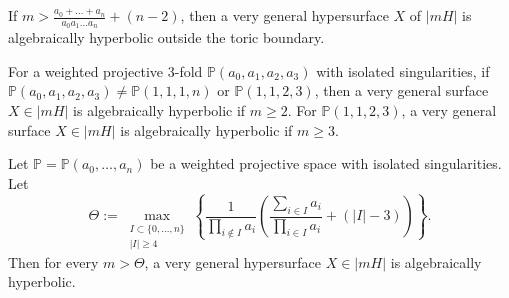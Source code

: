 \documentclass[10pt,a4paper]{amsart}
\begin{document}
\begin{proposition}\label{prop2}
 If $m > \frac{a_0 + \dots + a_n}{a_0a_1... a_n} + (n-2)$, then a very general hypersurface $X$ of $|mH|$ is algebraically hyperbolic outside the toric boundary.
\end{proposition}

\begin{proposition}\label{prop3}
For a weighted projective $3$-fold $\mathbb{P}(a_0,a_1,a_2,a_3)$ with isolated singularities, if $\mathbb{P}(a_0,a_1,a_2,a_3) \neq \mathbb{P}(1,1,1,n)$ or $\mathbb{P}(1,1,2,3)$, then a very general surface $X\in |mH|$ is algebraically hyperbolic if $m \geq 2$. For $\mathbb{P}(1,1,2,3)$, a very general surface $X\in|mH|$ is algebraically hyperbolic if $m\geq 3$.
\end{proposition}

\begin{proposition}\label{prop4}
  
Let $\mathbb{P} = \mathbb{P}(a_0,\dots,a_n)$ be a weighted projective space with isolated singularities. Let
\[
\Theta := \max_{\substack{I \subset \{0,\dots,n\} \\ |I|\ge 4}} \left\{\frac1{\prod_{i\notin I}a_i} \left( \frac{\sum_{i \in I} a_i}{\prod_{i\in I} a_i} + (|I|-3) \right)\right\}.
\]
Then for every $m > \Theta$, a very general hypersurface $X \in |mH|$ is algebraically hyperbolic.
\end{proposition}
\end{document}
